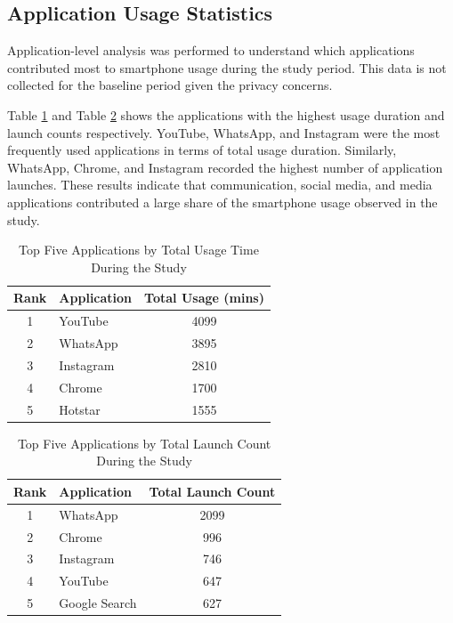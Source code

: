 \documentclass[11pt]{report}
\begin{document}
\subsection{Application Usage Statistics}

Application-level analysis was performed to understand which applications 
contributed most to smartphone usage during the study period. This data is not 
collected for the baseline period given the privacy concerns. 

Table \ref{tab:top_apps_usage} and Table \ref{tab:top_apps_launches} shows the applications with the highest usage duration 
and launch counts respectively. YouTube, WhatsApp, and Instagram were the most 
frequently used applications in terms of total usage duration. Similarly, WhatsApp, 
Chrome, and Instagram recorded the highest number of application launches. These 
results indicate that communication, social media, and media applications 
contributed a large share of the smartphone usage observed in the study.

\begin{table}[H]
\centering
\caption{Top Five Applications by Total Usage Time During the Study}
\label{tab:top_apps_usage}
\begin{tabular}{|c|l|c|}
\hline
\textbf{Rank} & \textbf{Application} & \textbf{Total Usage (mins)} \\
\hline
1 & YouTube & 4099 \\
\hline
2 & WhatsApp & 3895 \\
\hline
3 & Instagram & 2810 \\
\hline
4 & Chrome & 1700 \\
\hline
5 & Hotstar & 1555 \\
\hline
\end{tabular}
\end{table}

\begin{table}[H]
\centering
\caption{Top Five Applications by Total Launch Count During the Study}
\label{tab:top_apps_launches}
\begin{tabular}{|c|l|c|}
\hline
\textbf{Rank} & \textbf{Application} & \textbf{Total Launch Count} \\
\hline
1 & WhatsApp & 2099 \\
\hline
2 & Chrome & 996 \\
\hline
3 & Instagram & 746 \\
\hline
4 & YouTube & 647 \\
\hline
5 & Google Search & 627 \\
\hline
\end{tabular}
\end{table}
\end{document}
